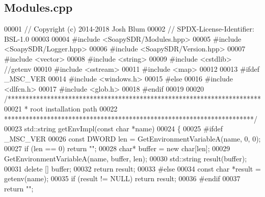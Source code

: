 \subsection{Modules.\+cpp}
\label{Modules_8cpp_source}

\begin{DoxyCode}
00001 \textcolor{comment}{// Copyright (c) 2014-2018 Josh Blum}
00002 \textcolor{comment}{// SPDX-License-Identifier: BSL-1.0}
00003 
00004 \textcolor{preprocessor}{#include <SoapySDR/Modules.hpp>}
00005 \textcolor{preprocessor}{#include <SoapySDR/Logger.hpp>}
00006 \textcolor{preprocessor}{#include <SoapySDR/Version.hpp>}
00007 \textcolor{preprocessor}{#include <vector>}
00008 \textcolor{preprocessor}{#include <string>}
00009 \textcolor{preprocessor}{#include <cstdlib>} \textcolor{comment}{//getenv}
00010 \textcolor{preprocessor}{#include <sstream>}
00011 \textcolor{preprocessor}{#include <map>}
00012 
00013 \textcolor{preprocessor}{#ifdef \_MSC\_VER}
00014 \textcolor{preprocessor}{#include <windows.h>}
00015 \textcolor{preprocessor}{#else}
00016 \textcolor{preprocessor}{#include <dlfcn.h>}
00017 \textcolor{preprocessor}{#include <glob.h>}
00018 \textcolor{preprocessor}{#endif}
00019 
00020 \textcolor{comment}{/***********************************************************************}
00021 \textcolor{comment}{ * root installation path}
00022 \textcolor{comment}{ **********************************************************************/}
00023 std::string getEnvImpl(\textcolor{keyword}{const} \textcolor{keywordtype}{char} *name)
00024 \{
00025 \textcolor{preprocessor}{    #ifdef \_MSC\_VER}
00026     \textcolor{keyword}{const} DWORD len = GetEnvironmentVariableA(name, 0, 0);
00027     \textcolor{keywordflow}{if} (len == 0) \textcolor{keywordflow}{return} \textcolor{stringliteral}{""};
00028     \textcolor{keywordtype}{char}* buffer = \textcolor{keyword}{new} \textcolor{keywordtype}{char}[len];
00029     GetEnvironmentVariableA(name, buffer, len);
00030     std::string result(buffer);
00031     \textcolor{keyword}{delete} [] buffer;
00032     \textcolor{keywordflow}{return} result;
00033 \textcolor{preprocessor}{    #else}
00034     \textcolor{keyword}{const} \textcolor{keywordtype}{char} *result = getenv(name);
00035     \textcolor{keywordflow}{if} (result != NULL) \textcolor{keywordflow}{return} result;
00036 \textcolor{preprocessor}{    #endif}
00037     \textcolor{keywordflow}{return} \textcolor{stringliteral}{""};

\end{DoxyCode}
